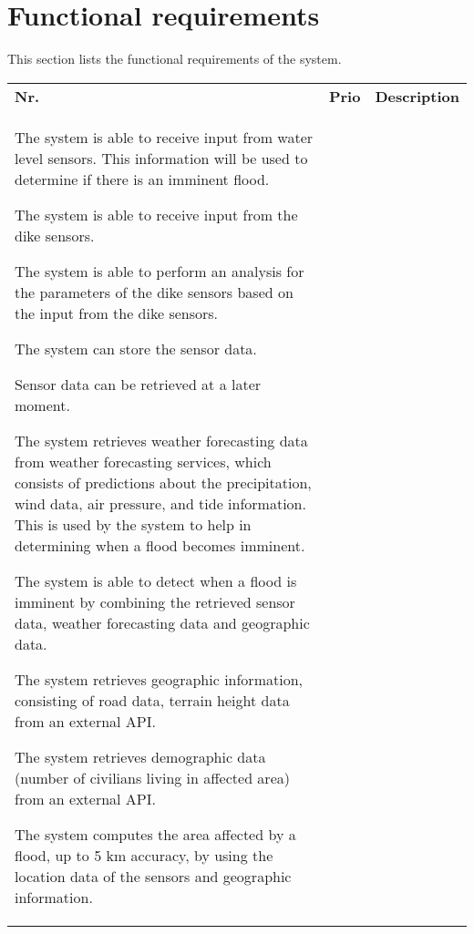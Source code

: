 \newpage
\section{Functional requirements}
\label{sec:functional-requirements}
This section lists the functional requirements of the system.

\begin{longtable}{L{0.1\textwidth} L{0.12\textwidth} L{0.78\textwidth}}
			
	\textbf{Nr.} & \textbf{Prio} & \textbf{Description} \\
			    
	{The system is able to receive input from water level sensors. This information will be used to determine if there is an imminent flood.}
			    
	{The system is able to receive input from the dike sensors.}
				
	{The system is able to perform an analysis for the parameters of the dike sensors based on the input from the dike sensors.}
				
	{ The system can store the sensor data. }
				
	{ Sensor data can be retrieved at a later moment. }
			
	{The system retrieves weather forecasting data from weather forecasting services, which consists of predictions about the precipitation, wind data, air pressure, and tide information. This is used by the system to help in determining when a flood becomes imminent.}
			     
	{ The system is able to detect when a flood is imminent by combining the retrieved sensor data, weather forecasting data and geographic data. }
			    
	{ The system retrieves geographic information, consisting of road data, terrain height data from an external API.}
	
	{ The system retrieves demographic data (number of civilians living in affected area) from an external API. }
			        
	{ The system computes the area affected by a flood, up to 5 km accuracy, by using the location data of the sensors and geographic information. }
			    

\end{longtable}

